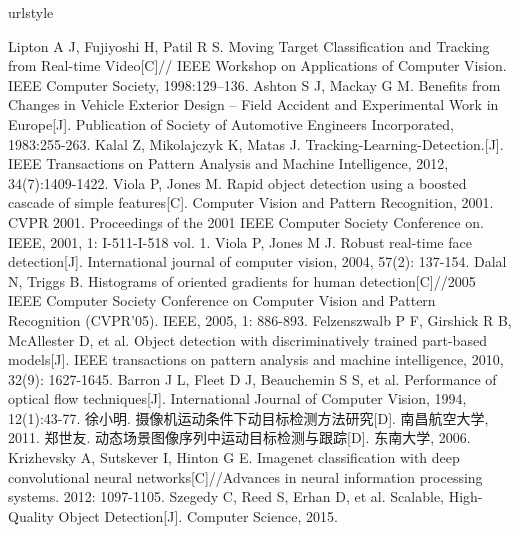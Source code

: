 
% 
%
%
\begin{thebibliography}{148}
\addtolength{\itemsep}{-1.5em}
\setlength{\itemsep}{-1.0pt}
\providecommand{\natexlab}[1]{#1}
\providecommand{\url}[1]{\texttt{#1}}
\expandafter\ifx\csname urlstyle\endcsname\relax
\providecommand{\doi}[1]{doi: #1}\else
\providecommand{\doi}{doi: \begingroup \urlstyle{rm}\Url}\fi

Lipton A J, Fujiyoshi H, Patil R S. Moving Target Classification and Tracking from Real-time Video[C]// IEEE Workshop on Applications of Computer Vision. IEEE Computer Society, 1998:129--136.
Ashton S J, Mackay G M. Benefits from Changes in Vehicle Exterior Design – Field Accident and Experimental Work in Europe[J]. Publication of Society of Automotive Engineers Incorporated, 1983:255-263.
Kalal Z, Mikolajczyk K, Matas J. Tracking-Learning-Detection.[J]. IEEE Transactions on Pattern Analysis and Machine Intelligence, 2012, 34(7):1409-1422.
Viola P, Jones M. Rapid object detection using a boosted cascade of simple features[C]. Computer Vision and Pattern Recognition, 2001. CVPR 2001. Proceedings of the 2001 IEEE Computer Society Conference on. IEEE, 2001, 1: I-511-I-518 vol. 1.
Viola P, Jones M J. Robust real-time face detection[J]. International journal of computer vision, 2004, 57(2): 137-154.
Dalal N, Triggs B. Histograms of oriented gradients for human detection[C]//2005 IEEE Computer Society Conference on Computer Vision and Pattern Recognition (CVPR'05). IEEE, 2005, 1: 886-893.
Felzenszwalb P F, Girshick R B, McAllester D, et al. Object detection with discriminatively trained part-based models[J]. IEEE transactions on pattern analysis and machine intelligence, 2010, 32(9): 1627-1645.
Barron J L, Fleet D J, Beauchemin S S, et al. Performance of optical flow techniques[J]. International Journal of Computer Vision, 1994, 12(1):43-77.
徐小明. 摄像机运动条件下动目标检测方法研究[D]. 南昌航空大学, 2011.
郑世友. 动态场景图像序列中运动目标检测与跟踪[D]. 东南大学, 2006.
Krizhevsky A, Sutskever I, Hinton G E. Imagenet classification with deep convolutional neural networks[C]//Advances in neural information processing systems. 2012: 1097-1105.
Szegedy C, Reed S, Erhan D, et al. Scalable, High-Quality Object Detection[J]. Computer Science, 2015.

\end{thebibliography}
